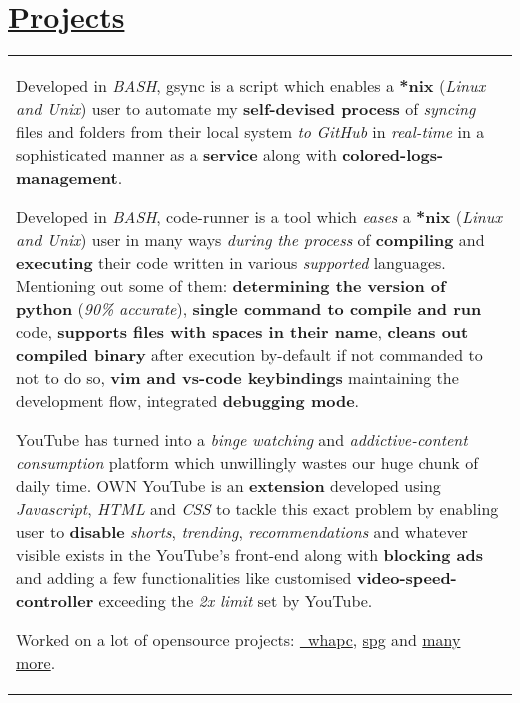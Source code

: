 \documentclass[a4paper,10pt]{extarticle} %
\begin{document}
\section{\textcolor{primary}{\href{https://www.github.com/proffapt}{Projects}}}
 \vspace{-0.5cm}
\begin{tabular}{p{19.7cm}}
\begin{description}[style=nextline, font=$\bullet$\hspace{2mm}\normalsize]
 
 \item[{\href{https://github.com/proffapt/gsync}{GSYNC}}] 
 Developed in \textit{BASH}, gsync is a script which enables a \textbf{*nix} (\textit{Linux and Unix}) user to automate my \textbf{self-devised process} of \textit{syncing} files and folders from their local system \textit{to GitHub} in \textit{real-time} in a sophisticated manner as a \textbf{service} along with \textbf{colored-logs-management}.
 
 \item[{\href{https://github.com/proffapt/code-runner}{Code\_Runner}}] 
Developed in \textit{BASH}, code-runner is a tool which \textit{eases} a \textbf{*nix} (\textit{Linux and Unix}) user in many ways \textit{during the process} of \textbf{compiling} and \textbf{executing} their code written in various \textit{supported} languages. Mentioning out some of them: \textbf{determining the version of python} (\textit{90\% accurate}), \textbf{single command to compile and run} code, \textbf{supports files with spaces in their name}, \textbf{cleans out compiled binary} after execution by-default if not commanded to not to do so, \textbf{vim and vs-code keybindings} maintaining the development flow, integrated \textbf{debugging mode}.
 
 \item[{\href{https://github.com/proffapt/own-youtube}{OWN YouTube}}] 
 YouTube has turned into a \textit{binge watching} and \textit{addictive-content consumption} platform which unwillingly wastes our huge chunk of daily time. OWN YouTube is an \textbf{extension} developed using \textit{Javascript}, \textit{HTML} and \textit{CSS} to tackle this exact problem by enabling user to \textbf{disable} \textit{shorts}, \textit{trending}, \textit{recommendations} and whatever visible exists in the YouTube's front-end along with \textbf{blocking ads} and adding a few functionalities like customised \textbf{video-speed-controller} exceeding the \textit{2x limit} set by YouTube.
 
  \item[Github OpenSource Projects] Worked on a lot of opensource projects: \href{https://github.com/proffapt/whapc}{\ whapc}, 
  \href{https://github.com/proffapt/spg}{spg} and \href{https://github.com/proffapt?tab=repositories}{many more}.
\end{description}
\end{tabular}
\end{document}
